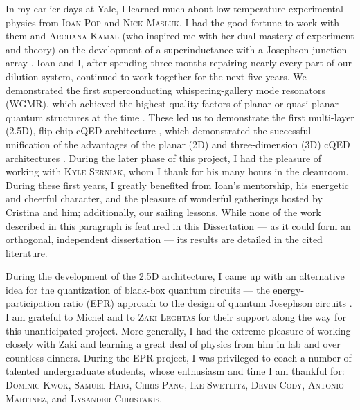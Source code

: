 In my earlier days at Yale, I learned much about low-temperature experimental physics from \textsc{Ioan Pop} and \textsc{Nick Masluk}. I had the good fortune to work with them and \textsc{Archana Kamal} (who inspired me with her dual mastery of experiment and theory) on the development of a superinductance with a Josephson junction array \citep{Masluk2012, Minev2012-APSMM}. Ioan and I, after spending three months repairing nearly every part of our dilution system, continued to work together for the next five years. We demonstrated the first superconducting whispering-gallery mode resonators (WGMR), which achieved the highest quality factors of planar or quasi-planar quantum structures at the time \citep{Minev2013}. These led us to demonstrate the first multi-layer (2.5D), flip-chip cQED architecture \citep{Minev2015-patent, Minev2016}, which demonstrated the successful unification of the advantages of the planar (2D) and three-dimension (3D) cQED architectures \citep{Minev2013-APSMM,Minev2014-APSMM,Minev2015-APSMM,Serniak2015-APSMM}. During the later phase of this project, I had the pleasure of working with \textsc{Kyle Serniak}, whom I thank for his many hours in the cleanroom. During these first years, I greatly benefited from Ioan’s mentorship, his energetic and cheerful character, and the pleasure of wonderful gatherings hosted by Cristina and him; additionally, our sailing lessons. While none of the work described in this paragraph is featured in this Dissertation --- as it could form an orthogonal, independent dissertation --- its results are detailed in the cited literature. 

During the development of the 2.5D architecture, I came up with an alternative idea for the quantization of black-box quantum circuits --- the energy-participation ratio (EPR) approach to the design of quantum Josephson circuits \citep{Minev2018-EPR}. I am grateful to Michel and to \textsc{Zaki Leghtas} for their support along the way for this unanticipated project. More generally, I had the extreme pleasure of working closely with Zaki and learning a great deal of physics from him in lab and over countless dinners. During the EPR project, I was privileged to coach a number of talented undergraduate students, whose enthusiasm and time I am thankful for: \textsc{Dominic Kwok, Samuel Haig, Chris Pang, Ike Swetlitz, Devin Cody, Antonio Martinez,} and \textsc{Lysander Christakis}.

